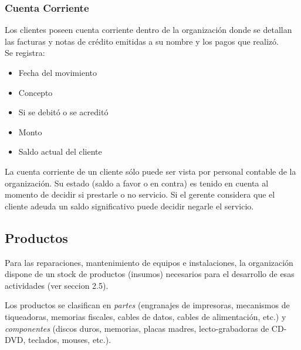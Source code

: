 \documentclass[12pt]{extarticle}
\begin{document}
\begin{spacing}{1.2}
    \subsubsection{Cuenta Corriente}
        Los clientes poseen cuenta corriente dentro de la organización donde se detallan las facturas y notas de crédito emitidas a su nombre y los pagos que realizó.\\
        Se registra:
        \begin{itemize}
            \item Fecha del movimiento
            \item Concepto
            \item Si se debitó o se acreditó
            \item Monto
            \item Saldo actual del cliente
        \end{itemize}

        La cuenta corriente de un cliente sólo puede ser vista por personal contable de la organización. Su estado (saldo a favor o en contra) es tenido en cuenta al momento de decidir si prestarle o no servicio. Si el gerente considera que el cliente adeuda un saldo significativo puede decidir negarle el servicio.

    \pagebreak
    \subsection{Productos}
        Para las reparaciones, mantenimiento de equipos e instalaciones, la organización dispone de un stock de productos (insumos) necesarios para el desarrollo de esas actividades (ver seccion 2.5).
    
        Los productos se clasifican en \textit{partes} (engranajes de impresoras, mecanismos de tiqueadoras, memorias fiscales, cables de datos, cables de alimentación, etc.) y \textit{componentes} (discos duros, memorias, placas madres, lecto-grabadoras de CD-DVD, teclados, mouses, etc.).\\


\end{spacing}
\end{document}
